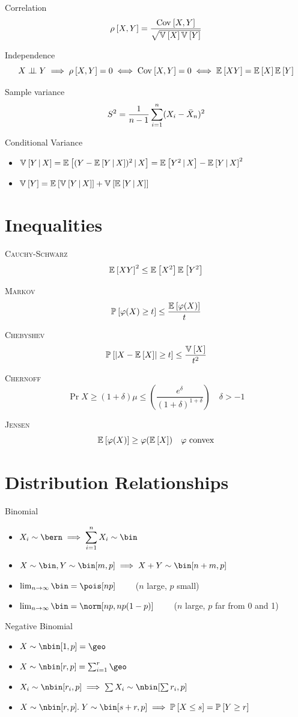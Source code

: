 \documentclass[landscape]{article}
\begin{document}
\begin{multicols*}{2}
Correlation
$$\rho_{}\left[X,Y\right] = \displaystyle\frac{\mathrm{Cov}_{}\left[X,Y\right]}{\sqrt{\mathbb{V}_{}\left[X\right]\mathbb{V}_{}\left[Y\right]}}$$

Independence
$$X\perp\!\!\!\perp Y \;\Longrightarrow\; \rho_{}\left[X,Y\right] = 0 \;\Longleftrightarrow\; \mathrm{Cov}_{}\left[X,Y\right] = 0 \;\Longleftrightarrow\; \mathbb{E}_{}\left[XY\right]=\mathbb{E}_{}\left[X\right]\mathbb{E}_{}\left[Y\right]$$

Sample variance
$$S^2 = \frac{1}{n-1}\sum_{i=1}^n(X_i-\bar{X}_n)^2$$

Conditional Variance
\begin{itemize}
  \item $\mathbb{V}_{}\left[Y\,|\, X\right] = \mathbb{E}_{}\left[(Y-\mathbb{E}_{}\left[Y\,|\, X\right])^2\,|\, X\right] =\mathbb{E}_{}\left[Y^2\,|\, X\right]-\mathbb{E}_{}\left[Y\,|\, X\right]^2$
  \item $\mathbb{V}_{}\left[Y\right] = \mathbb{E}_{}\left[\mathbb{V}_{}\left[Y\,|\, X\right]\right]+\mathbb{V}_{}\left[\mathbb{E}_{}\left[Y\,|\, X\right]\right]$
\end{itemize}

\section{Inequalities}

\textsc{Cauchy-Schwarz}
$$\mathbb{E}_{}\left[XY\right]^2 \le \mathbb{E}_{}\left[X^2\right]\mathbb{E}_{}\left[Y^2\right]$$
  
\textsc{Markov} 
$$\mathbb{P}_{}\left[\varphi(X) \ge t\right]\le\frac{\mathbb{E}_{}\left[\varphi(X)\right]}{t}$$

\textsc{Chebyshev}
$$\mathbb{P}_{}\left[\lvert X-\mathbb{E}_{}\left[X\right]\rvert \ge t\right] \le \frac{\mathbb{V}_{}\left[X\right]}{t^2}$$

\textsc{Chernoff}
$$\Pr{X \ge (1+\delta)\mu} 
\le \left(\frac{e^\delta}{(1+\delta)^{1+\delta}}\right) \quad \delta>-1$$

\textsc{Jensen}\label{jensen}
$$\mathbb{E}_{}\left[\varphi(X)\right] \ge \varphi(\mathbb{E}_{}\left[X\right]) \quad \varphi \text{ convex}$$

\section{Distribution Relationships}

Binomial
\begin{itemize}
  \item $X_i \dist \bern \imp \displaystyle\sum_{i=1}^n X_i \dist \bin$
  \item $X\dist\bin, Y\dist\bin[m,p] \imp X+Y\dist\bin[n+m,p]$
  \item $\limn\bin = \pois[np] \qquad$ ($n$ large, $p$ small)
  \item $\limn\bin = \norm[np,np(1-p)] \qquad$ ($n$ large, $p$ far from 0 and 1)
\end{itemize}

Negative Binomial
\begin{itemize}
  \item $ X\dist \nbin[1,p] = \geo $
  \item $ X\dist \nbin[r,p] = \sum_{i=1}^r \geo $
  \item $X_i\dist \nbin[r_i,p] \imp \sum X_i\dist \nbin[\sum r_i,p] $
  \item $X\dist \nbin[r,p].\; Y\dist \bin[s+r,p] \imp \Pr{X\le s} = \Pr{Y\ge r}$
\end{itemize}


\end{multicols*}
\end{document}
